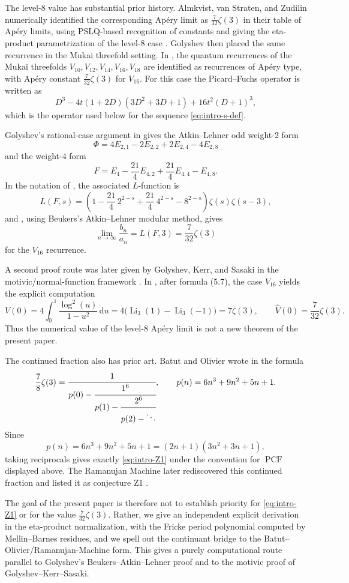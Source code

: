 \documentclass[11pt]{amsart}
\numberwithin{equation}{section}
\theoremstyle{plain}
\theoremstyle{definition}
\theoremstyle{remark}
\newcommand{\dd}{\mathrm{d}}
\DeclareMathOperator{\PCF}{PCF}
\begin{document}
The level-$8$ value has substantial prior history. Almkvist, van Straten,
and Zudilin numerically identified the corresponding Apéry limit as
$\frac{7}{32}\zeta(3)$ in their table of Apéry limits, using PSLQ-based
recognition of constants and giving the eta-product parametrization of the
level-$8$ case \cite{ASZ08}. Golyshev then placed the same recurrence in the
Mukai threefold setting. In \cite[Theorem~2.4]{Gol09}, the quantum
recurrences of the Mukai threefolds $V_{10},V_{12},V_{14},V_{16},V_{18}$ are
identified as recurrences of Apéry type, with Apéry constant
$\frac{7}{32}\zeta(3)$ for $V_{16}$. For this case the Picard--Fuchs operator
is written as
\[
D^3-4t(1+2D)(3D^2+3D+1)+16t^2(D+1)^3,
\]
which is the operator used below for the sequence \eqref{eq:intro-s-def}.

Golyshev's rational-case argument in \cite[Section~3]{Gol09} gives the
Atkin--Lehner odd weight-$2$ form
\[
\Phi=4E_{2,1}-2E_{2,2}+2E_{2,4}-4E_{2,8}
\]
and the weight-$4$ form
\[
F=E_4-\frac{21}{4}E_{4,2}+\frac{21}{4}E_{4,4}-E_{4,8}.
\]
In the notation of \cite{Gol09}, the associated $L$-function is
\[
L(F,s)=\left(1-\frac{21}{4}\,2^{2-s}+\frac{21}{4}\,4^{2-s}-8^{2-s}\right)
\zeta(s)\zeta(s-3),
\]
and \cite[Corollary~3.4]{Gol09}, using Beukers's Atkin--Lehner modular
method, gives
\[
\lim_{n\to\infty}\frac{b_n}{a_n}=L(F,3)=\frac{7}{32}\zeta(3)
\]
for the $V_{16}$ recurrence.

A second proof route was later given by Golyshev, Kerr, and Sasaki in the
motivic/normal-function framework \cite{GKS24}. In \cite[Section~5.5]{GKS24},
after formula (5.7), the case $V_{16}$ yields the explicit computation
\[
V(0)=4\int_0^1\frac{\log^2(u)}{1-u^2}\,\dd u
=4\bigl(\operatorname{Li}_3(1)-\operatorname{Li}_3(-1)\bigr)
=7\zeta(3),
\qquad
\widehat V(0)=\frac{7}{32}\zeta(3).
\]
Thus the numerical value of the level-$8$ Apéry limit is not a new theorem
of the present paper.

The continued fraction also has prior art. Batut and Olivier wrote in
\cite[Section~3.2.4]{BO80} the formula
\[
\frac{7}{8}\zeta(3)=
\cfrac{1}{p(0)-\cfrac{1^6}{p(1)-\cfrac{2^6}{p(2)-\ddots}}},
\qquad
p(n)=6n^3+9n^2+5n+1.
\]
Since
\[
p(n)=6n^3+9n^2+5n+1=(2n+1)(3n^2+3n+1),
\]
taking reciprocals gives exactly \eqref{eq:intro-Z1} under the convention
for $\PCF$ displayed above. The Ramanujan Machine later rediscovered this
continued fraction and listed it as conjecture Z1 \cite{RMK21}.

The goal of the present paper is therefore not to establish priority for
\eqref{eq:intro-Z1} or for the value $\frac{7}{32}\zeta(3)$. Rather, we give
an independent explicit derivation in the eta-product normalization, with
the Fricke period polynomial computed by Mellin--Barnes residues, and we
spell out the continuant bridge to the Batut--Olivier/Ramanujan-Machine
form. This gives a purely computational route parallel to Golyshev's
Beukers--Atkin--Lehner proof and to the motivic proof of
Golyshev--Kerr--Sasaki.
\end{document}
